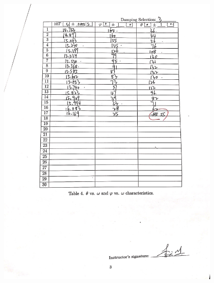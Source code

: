 \documentclass[12pt,a4paper]{article}
\begin{document}
\begin{figure}[t]
    \centering
    \includegraphics[scale=0.25]{raw3.jpg}
\end{figure}
\end{document}
